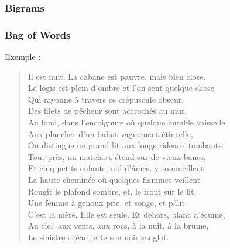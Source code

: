 \begin{frame}
  \frametitle{Bigrams}
\end{frame}

\begin{frame}[t]
  \frametitle{Bag of Words}
  \vspace{1cm}
  Exemple :

  \Large
  \begin{quote}
    Il est nuit. La cabane est pauvre, mais bien close.\\
    Le logis est plein d'ombre et l'on sent quelque chose\\
    Qui rayonne à travers ce crépuscule obscur.\\
    Des filets de pêcheur sont accrochés au mur.\\
    Au fond, dans l'encoignure où quelque humble vaisselle\\
    Aux planches d'un bahut vaguement étincelle,\\
    On distingue un grand lit aux longs rideaux tombants.\\
    Tout près, un matelas s'étend sur de vieux bancs,\\
    Et cinq petits enfants, nid d'âmes, y sommeillent\\
    La haute cheminée où quelques flammes veillent\\
    Rougit le plafond sombre, et, le front sur le lit,\\
    Une femme à genoux prie, et songe, et pâlit.\\
    C'est la mère. Elle est seule. Et dehors, blanc d'écume,\\
    Au ciel, aux vents, aux rocs, à la nuit, à la brume,\\
    Le sinistre océan jette son noir sanglot.
  \end{quote}
\end{frame}

